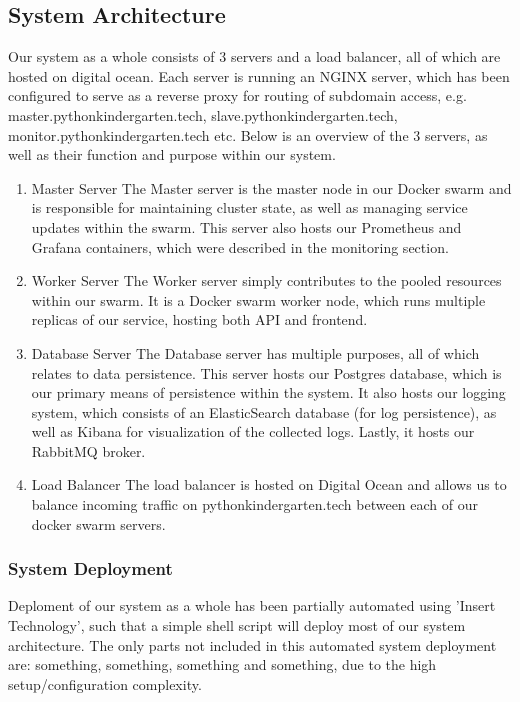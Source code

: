  \subsection{System Architecture}
  Our system as a whole consists of 3 servers and a load balancer, all of which are hosted on digital ocean.
  Each server is running an NGINX server, which has been configured to serve as a reverse proxy for routing of subdomain access, e.g. master.pythonkindergarten.tech, slave.pythonkindergarten.tech, monitor.pythonkindergarten.tech etc.
  \newline
  Below is an overview of the 3 servers, as well as their function and purpose within our system.\newline
  
  \begin{enumerate}
    \item Master Server\newline
    The Master server is the master node in our Docker swarm and is responsible for maintaining cluster state, as well as managing service updates within the swarm.
    This server also hosts our Prometheus and Grafana containers, which were described in the monitoring section.
    \item Worker Server\newline
    The Worker server simply contributes to the pooled resources within our swarm. 
    It is a Docker swarm worker node, which runs multiple replicas of our service, hosting both API and frontend.

    \item Database Server\newline
    The Database server has multiple purposes, all of which relates to data persistence.
    This server hosts our Postgres database, which is our primary means of persistence within the system. 
    \newline
    It also hosts our logging system, which consists of an ElasticSearch database (for log persistence), as well as Kibana for visualization of the collected logs.
    \newline
    Lastly, it hosts our RabbitMQ broker.
    \item Load Balancer\newline
    The load balancer is hosted on Digital Ocean and allows us to balance incoming traffic on pythonkindergarten.tech between each of our docker swarm servers.
  \end{enumerate}
  \subsubsection{System Deployment}
  Deploment of our system as a whole has been partially automated using 'Insert Technology', such that a simple shell script will deploy most of our system architecture.
  The only parts not included in this automated system deployment are: something, something, something and something, due to the high setup/configuration complexity.

